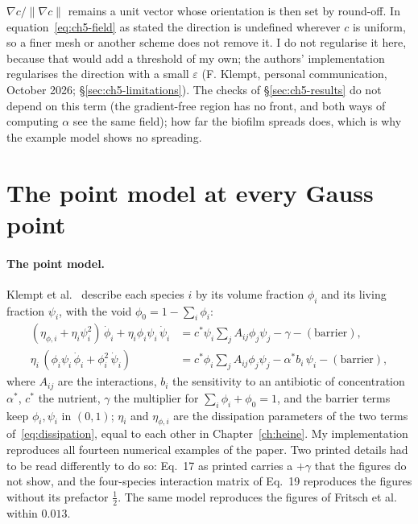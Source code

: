 \begin{enumerate}
      $\nabla c/\|\nabla c\|$ remains a unit vector whose orientation is then
      set by round-off. In equation~\eqref{eq:ch5-field} as stated the
      direction is undefined wherever $c$ is uniform, so a finer mesh or
      another scheme does not remove it. I do not regularise it here, because
      that would add a threshold of my own; the authors' implementation
      regularises the direction with a small $\varepsilon$ (F. Klempt,
      personal communication, October 2026;
      \S\ref{sec:ch5-limitations}). The checks of \S\ref{sec:ch5-results} do
      not depend on this term (the gradient-free region has no front, and
      both ways of computing $\alpha$ see the same field); how far the
      biofilm spreads does, which is why the example model shows no
      spreading.
\end{enumerate}

\section{The point model at every Gauss point}
\label{sec:ch5-composition}

\paragraph{The point model.} Klempt et al.~\cite{Klempt2026ContinuumBacterialGrowth}
describe each species $i$ by its volume fraction $\phi_i$ and its living
fraction $\psi_i$, with the void $\phi_0=1-\sum_i\phi_i$:
\begin{equation}
\begin{aligned}
(\eta_{\phi,i}+\eta_i\psi_i^2)\,\dot\phi_i+\eta_i\phi_i\psi_i\,\dot\psi_i
&= c^*\psi_i\textstyle\sum_j A_{ij}\phi_j\psi_j-\gamma-(\text{barrier}),\\
\eta_i\,(\phi_i\psi_i\,\dot\phi_i+\phi_i^2\,\dot\psi_i)
&= c^*\phi_i\textstyle\sum_j A_{ij}\phi_j\psi_j-\alpha^* b_i\,\psi_i-(\text{barrier}),
\end{aligned}
\label{eq:ch5-point}
\end{equation}
where $A_{ij}$ are the interactions, $b_i$ the sensitivity to an antibiotic of
concentration $\alpha^*$, $c^*$ the nutrient, $\gamma$ the multiplier for
$\sum_i\phi_i+\phi_0=1$, and the barrier terms keep $\phi_i,\psi_i$
in $(0,1)$; $\eta_i$ and $\eta_{\phi,i}$ are the dissipation parameters of the two
terms of~\eqref{eq:dissipation}, equal to each other in Chapter~\ref{ch:heine}.
My implementation reproduces all fourteen numerical examples of the
paper. Two printed details had to be read differently to do so: Eq.~17 as
printed carries a $+\gamma$ that the figures do not show, and the four-species
interaction matrix of Eq.~19 reproduces the figures without its prefactor
$\tfrac12$. The same model reproduces the figures of Fritsch et
al.~\cite{Fritsch2025BayesianMicrofilms} within $0.013$.

